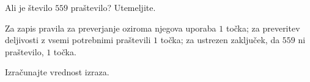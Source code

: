 \documentclass[addpoints]{exam}
\begin{document}
\begin{questions}




        \question[3]
        Ali je število $559$ praštevilo? Utemeljite.
        
        \begin{solution}[7cm]
            Za zapis pravila za preverjanje oziroma njegova uporaba $1$ točka; za preveritev deljivosti z vsemi potrebnimi praštevili $1$ točka;
            za ustrezen zaključek, da $559$ ni praštevilo, $1$ točka.
        \end{solution}
    

    \question
    Izračunajte vrednost izraza.
\end{questions}
\end{document}
